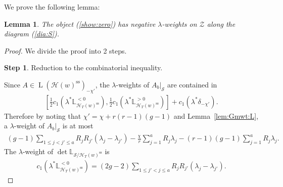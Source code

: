 \documentclass[11pt,oneside,a4paper,mathscr]{amsart}
\newtheorem{lemma}[thm]{Lemma}
\theoremstyle{definition}
\newtheorem{sstep}{Step}
\renewcommand{\leq}{\leqslant}
\newcommand{\cS}{\mathcal{S}}
\newcommand{\LL}{\operatorname{L}}
\newcommand{\cH}{\mathcal{H}}
\begin{document}
We prove the following lemma: 
\begin{lemma}\label{lem:nweight}
    The object (\ref{show:zero}) has negative $\lambda$-weights on $\mathcal{Z}$ along the diagram (\ref{dia:S}). 
\end{lemma}
\begin{proof} We divide the proof into 2 steps. 
\begin{sstep}
    Reduction to the combinatorial inequality. 
\end{sstep}
Since $A\in \LL(\cH(w)^{\mathrm{ss}})_{-\chi'}$, the $\lambda$-weights
of $A_b|_{\mathcal{S}}$ are contained in 
\begin{align}\label{wt:A}
    \left[\frac{1}{2}c_1(\lambda^*\mathbb{L}_{\cH_T(w)^{\mathrm{ss}}}^{<0}), 
    \frac{1}{2}c_1(\lambda^*\mathbb{L}_{\cH_T(w)^{\mathrm{ss}}}^{>0})
    \right]+c_1(\lambda^* \delta_{-\chi'}).
\end{align}
Therefore 
by noting that $\chi'=\chi+r(r-1)(g-1)$ and Lemma~\ref{lem:Gmwt:L}, 
a $\lambda$-weight of $A_b|_{\mathcal{S}}$
is at most
\begin{align}\label{wt:1}
    (g-1)\sum_{1\leq j<j' \leq a}R_j R_{j'}(\lambda_j-\lambda_{j'})-\frac{\chi}{r}\sum_{j=1}^a R_j \lambda_j-(r-1)(g-1)\sum_{j=1}^a R_j\lambda_j.
\end{align}
The $\lambda$-weight of 
$\det \mathbb{L}_{\cS/\cH_T(w)^{\mathrm{ss}}}$
is \begin{align}\label{wt:2}
c_1(\lambda^*\mathbb{L}_{\cH_T(w)^{\mathrm{ss}}}^{<0})=(2g-2)\sum_{1\leq j'<j \leq a}R_j R_{j'}(\lambda_j-\lambda_{j'}).
\end{align}


\end{proof}
\end{document}
